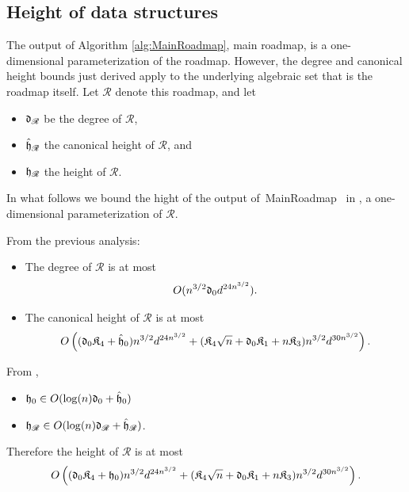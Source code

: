 \documentclass[12pt]{article}
\def\fh{\frak{h}}
\def\fhh{\hat{\frak{h}}}
\def\fK{\frak{K}}
\def\sR {\mathscr{R}}
\def\MainRoadmap{{\sf MainRoadmap}}
\begin{document}
\subsection{Height of data structures}
The output of Algorithm \ref{alg:MainRoadmap}, main roadmap, is a one-dimensional parameterization of the roadmap. However, the degree and canonical height bounds just derived  apply to the underlying algebraic set that is the roadmap itself. Let $\mathscr{R}$ denote this roadmap, and let
\begin{itemize}
    \item $\frak{d}_{\sR}$ be the degree of $\sR$,
    \item $\fhh_{\sR}$ the canonical height of $\sR$, and
    \item $\fh_{\sR}$ the height of $\sR$.
\end{itemize}

In what follows we bound the hight of the output of~\MainRoadmap~ in \cite{SchostMohabBabySteps2011}, a one-dimensional parameterization of $\sR$. 


From the previous analysis:
\begin{itemize}
    \item The degree of $\sR$ is at most
    \[
    O(n^{3/2}\frak{d}_0d^{24n^{3/2}}).
    \]
    \item The canonical height of $\sR$ is at most 
    \[
    O\left((\frak{d}_0\fK_4+\frak{\hat{h}}_0)n^{3/2}d^{24n^{3/2}} + (\fK_4\sqrt{n}+\frak{d}_0\fK_1+n\fK_3)n^{3/2}d^{30n^{3/2}}\right).
    \]
\end{itemize}
From \cite[Proposition 2.39(5)]{EN}, 
\begin{itemize}
    \item $\fh_0 \in O(\log(n)\frak{d}_0 + \frak{\hat{h}}_0)$
    \item $\frak{h}_\mathscr{R} \in O(\log(n)\frak{d}_{\sR} + \frak{\hat{h}}_{\sR})$.
\end{itemize}
Therefore the height of $\sR$ is at most 
\[
O\left((\frak{d}_0\fK_4+\frak{h}_0)n^{3/2}d^{24n^{3/2}} + (\fK_4\sqrt{n}+\frak{d}_0\fK_1+n\fK_3)n^{3/2}d^{30n^{3/2}}\right).
\]
\end{document}
